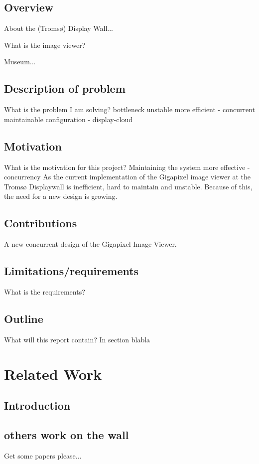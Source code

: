 \documentclass[12pt, a4paper, oneside]{article}
\begin{document}
\subsection{Overview}
About the (Tromsø) Display Wall...

What is the image viewer?

Museum...


\subsection{Description of problem}
What is the problem I am solving?
bottleneck
unstable
more efficient - concurrent
maintainable
configuration - display-cloud

\subsection{Motivation}
What is the motivation for this project?
Maintaining the system
more effective - concurrency
As the current implementation of the Gigapixel image viewer at the Tromsø Displaywall is inefficient, hard to maintain and unstable. Because of this, the need for a new design is growing.  

\subsection{Contributions}
A new concurrent design of the Gigapixel Image Viewer.

\subsection{Limitations/requirements}
What is the requirements?

\subsection{Outline}
What will this report contain?
In section blabla

\section{Related Work}
\subsection{Introduction}
\subsection{others work on the wall}
Get some papers please...
\end{document}
